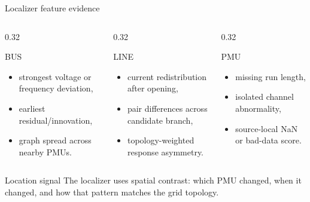 \documentclass[aspectratio=169,10pt,t]{beamer}
\begin{document}
\iffalse
\begin{frame}{Localizer feature evidence}
\small
\begin{columns}[T,totalwidth=\textwidth]
\begin{column}{0.32\textwidth}
\begin{block}{BUS}
\begin{itemize}
  \item strongest voltage or frequency deviation,
  \item earliest residual/innovation,
  \item graph spread across nearby PMUs.
\end{itemize}
\end{block}
\end{column}
\begin{column}{0.32\textwidth}
\begin{block}{LINE}
\begin{itemize}
  \item current redistribution after opening,
  \item pair differences across candidate branch,
  \item topology-weighted response asymmetry.
\end{itemize}
\end{block}
\end{column}
\begin{column}{0.32\textwidth}
\begin{block}{PMU}
\begin{itemize}
  \item missing run length,
  \item isolated channel abnormality,
  \item source-local NaN or bad-data score.
\end{itemize}
\end{block}
\end{column}
\end{columns}
\vspace{2mm}
\begin{alertblock}{Location signal}
The localizer uses spatial contrast: which PMU changed, when it changed, and how that pattern matches the grid topology.
\end{alertblock}
\end{frame}
\end{document}
